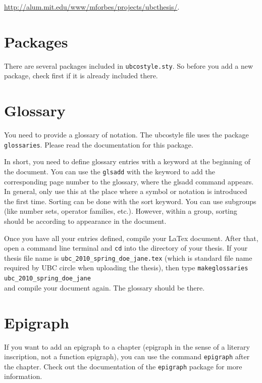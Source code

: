 \documentclass[msc,oneside]{ubcthesis}%
\begin{document}
\href{http://alum.mit.edu/www/mforbes/projects/ubcthesis/}{http://alum.mit.edu/www/mforbes/projects/ubcthesis/}.

\cite{MR2848848,MR2461448,MR2834159,infconv,convmono,MR2668638,Bauschke:2007-PA02,proxbas}

\section{Packages}
There are several packages included in \texttt{ubcostyle.sty}. So before you add a new package, check first if it is already included there.

\section{Glossary}
You need to provide a glossary of notation. The ubcostyle file uses the package \texttt{glossaries}. Please read the documentation for this package.

In short, you need to define glossary entries with a keyword at the beginning of the document. You can use the \texttt{glsadd} with the keyword to add the corresponding page number to the glossary, where the glsadd command appears. In general, only use this at the place where a symbol or notation is introduced the first time. Sorting can be done with the sort keyword. You can use subgroups (like number sets, operator families, etc.). However, within a group, sorting should be according to appearance in the document.

Once you have all your entries defined, compile your LaTex document. After that, open a command line terminal and \texttt{cd} into the directory of your thesis. If your thesis file name is \texttt{ubc\_2010\_spring\_doe\_jane.tex} (which is standard file name required by UBC circle when uploading the thesis), then type
\texttt{makeglossaries ubc\_2010\_spring\_doe\_jane}\\
and compile your document again. The glossary should be there.

\section{Epigraph}
If you want to add an epigraph to a chapter (epigraph in the sense of a literary inscription, not a function epigraph), you can use the command \texttt{epigraph} after the chapter. Check out the documentation of the \texttt{epigraph} package for more information.
\end{document}
